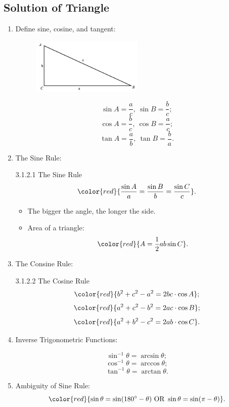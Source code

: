 \documentclass[12pt, a4paper]{article}
\begin{document}
\subsection{Solution of Triangle}
\begin{enumerate}
  \item Define sine, cosine, and tangent: 
  \begin{myclaim}{ }{}
    \begin{figure}[H]
      \centering
      \includegraphics[width=0.5\textwidth]{Fig.3.19.jpg}
    \end{figure}
    $$\sin A=\frac{a}{c},\ \sin B=\frac{b}{c};$$
    $$\cos A=\frac{b}{c},\ \cos B=\frac{a}{c};$$
    $$\tan A=\frac{a}{b},\ \tan B=\frac{b}{a}.$$
  \end{myclaim}
  \item The Sine Rule: 
  \begin{theorem}{3.1.2.1 The Sine Rule}{}
    $${\color{red}{\frac{\sin A}{a}=\frac{\sin B}{b}=\frac{\sin C}{c}}}.$$
  \end{theorem}
  \begin{itemize}
    \item The bigger the angle, the longer the side. 
    \item Area of a triangle: $${\color{red}{A=\frac{1}{2}ab\sin C}}.$$
  \end{itemize}
  \item The Consine Rule: 
  \begin{theorem}{3.1.2.2 The Cosine Rule}{}
    $${\color{red}{b^2+c^2-a^2=2bc\cdot\cos A}};$$
    $${\color{red}{a^2+c^2-b^2=2ac\cdot\cos B}};$$
    $${\color{red}{a^2+b^2-c^2=2ab\cdot\cos C}}.$$
  \end{theorem}
  \item Inverse Trigonometric Functions: 
  \begin{myclaim}{ }{}
    $$\sin^{-1}\theta=\arcsin\theta;$$
    $$\cos^{-1}\theta=\arccos\theta;$$
    $$\tan^{-1}\theta=\arctan\theta.$$
  \end{myclaim}
  \item Ambiguity of Sine Rule: 
  $${\color{red}{\sin\theta=\sin(180^\circ-\theta)\text{ OR }\sin\theta=\sin(\pi-\theta)}}.$$

\end{enumerate}
\end{document}

